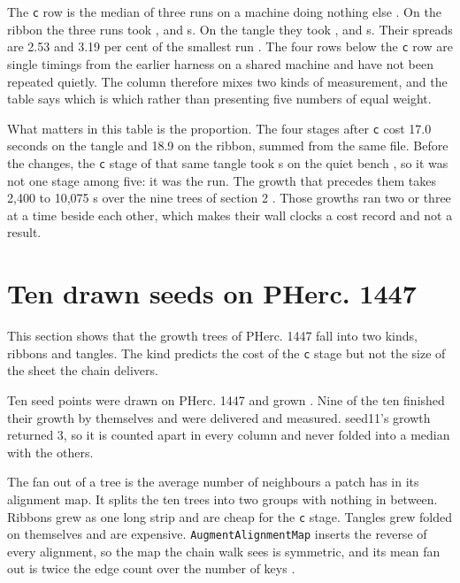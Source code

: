 The \texttt{c} row is the median of three runs on a machine doing nothing else {}. On the ribbon the three runs took \BenchBothSeedTwentySixMin{}, \BenchBothSeedTwentySixMedian{} and \BenchBothSeedTwentySixMax{} s. On the tangle they took \BenchBothSeedFortyMin{}, \BenchBothSeedFortyMedian{} and \BenchBothSeedFortyMax{} s. Their spreads are 2.53 and 3.19 per cent of the smallest run {}. The four rows below the \texttt{c} row are single timings from the earlier harness on a shared machine and have not been repeated quietly. The column therefore mixes two kinds of measurement, and the table says which is which rather than presenting five numbers of equal weight.

What matters in this table is the proportion. The four stages after \texttt{c} cost 17.0 seconds on the tangle and 18.9 on the ribbon, summed from the same file. Before the changes, the \texttt{c} stage of that same tangle took \BenchPlainSeedFortyMax{} s on the quiet bench {}, so it was not one stage among five: it was the run. The growth that precedes them takes 2,400 to 10,075 s over the nine trees of section 2 {}. Those growths ran two or three at a time beside each other, which makes their wall clocks a cost record and not a result.

\section{Ten drawn seeds on PHerc. 1447}

This section shows that the growth trees of PHerc. 1447 fall into two kinds, ribbons and tangles. The kind predicts the cost of the \texttt{c} stage but not the size of the sheet the chain delivers.

Ten seed points were drawn on PHerc. 1447 and grown {}. Nine of the ten finished their growth by themselves and were delivered and measured. seed11's growth returned 3, so it is counted apart in every column and never folded into a median with the others.

The fan out of a tree is the average number of neighbours a patch has in its alignment map. It splits the ten trees into two groups with nothing in between. Ribbons grew as one long strip and are cheap for the \texttt{c} stage. Tangles grew folded on themselves and are expensive. \texttt{AugmentAlignmentMap} inserts the reverse of every alignment, so the map the chain walk sees is symmetric, and its mean fan out is twice the edge count over the number of keys {}.

